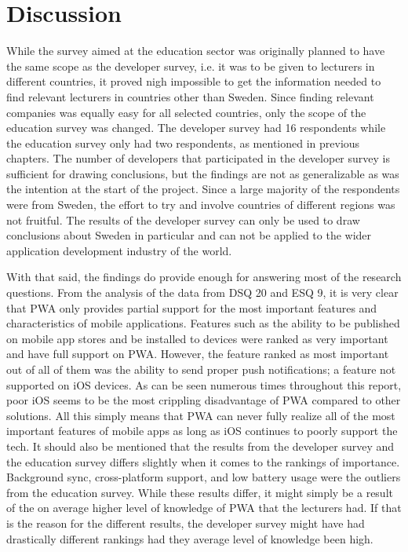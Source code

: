 \documentclass[a4paper,12pt]{article}
\begin{document}
\section{Discussion}
\label{Discussion}
While the survey aimed at the education sector was originally planned to have the same scope as the developer survey, i.e. it was to be given to lecturers in different countries, it proved nigh impossible to get the information needed to find relevant lecturers in countries other than Sweden. Since finding relevant companies was equally easy for all selected countries, only the scope of the education survey was changed. The developer survey had 16 respondents while the education survey only had two respondents, as mentioned in previous chapters. The number of developers that participated in the developer survey is sufficient for drawing conclusions, but the findings are not as generalizable as was the intention at the start of the project. Since a large majority of the respondents were from Sweden, the effort to try and involve countries of different regions was not fruitful. The results of the developer survey can only be used to draw conclusions about Sweden in particular and can not be applied to the wider application development industry of the world. 

With that said, the findings do provide enough for answering most of the research questions. From the analysis of the data from DSQ 20 and ESQ 9, it is very clear that PWA only provides partial support for the most important features and characteristics of mobile applications. Features such as the ability to be published on mobile app stores and be installed to devices were ranked as very important and have full support on PWA. However, the feature ranked as most important out of all of them was the ability to send proper push notifications; a feature not supported on iOS devices. As can be seen numerous times throughout this report, poor iOS seems to be the most crippling disadvantage of PWA compared to other solutions. All this simply means that PWA can never fully realize all of the most important features of mobile apps as long as iOS continues to poorly support the tech. It should also be mentioned that the results from the developer survey and the education survey differs slightly when it comes to the rankings of importance. Background sync, cross-platform support, and low battery usage were the outliers from the education survey. While these results differ, it might simply be a result of the on average higher level of knowledge of PWA that the lecturers had. If that is the reason for the different results, the developer survey might have had drastically different rankings had they average level of knowledge been high.
\end{document}
